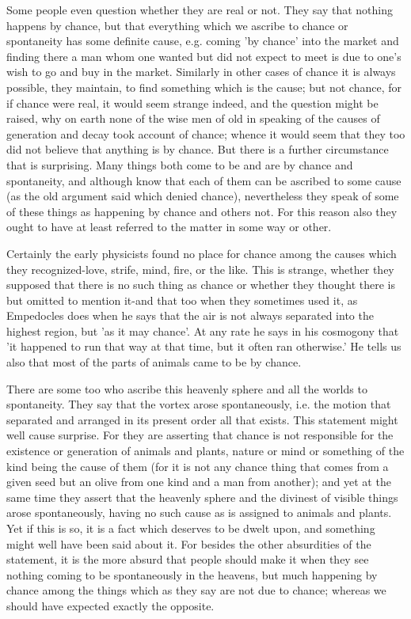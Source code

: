 Some people even question whether they are real or not. They say that
nothing happens by chance, but that everything which we ascribe to
chance or spontaneity has some definite cause, e.g. coming 'by chance'
into the market and finding there a man whom one wanted but did not
expect to meet is due to one's wish to go and buy in the market. Similarly
in other cases of chance it is always possible, they maintain, to
find something which is the cause; but not chance, for if chance were
real, it would seem strange indeed, and the question might be raised,
why on earth none of the wise men of old in speaking of the causes
of generation and decay took account of chance; whence it would seem
that they too did not believe that anything is by chance. But there
is a further circumstance that is surprising. Many things both come
to be and are by chance and spontaneity, and although know that each
of them can be ascribed to some cause (as the old argument said which
denied chance), nevertheless they speak of some of these things as
happening by chance and others not. For this reason also they ought
to have at least referred to the matter in some way or other.

Certainly the early physicists found no place for chance among the
causes which they recognized-love, strife, mind, fire, or the like.
This is strange, whether they supposed that there is no such thing
as chance or whether they thought there is but omitted to mention
it-and that too when they sometimes used it, as Empedocles does when
he says that the air is not always separated into the highest region,
but 'as it may chance'. At any rate he says in his cosmogony that
'it happened to run that way at that time, but it often ran otherwise.'
He tells us also that most of the parts of animals came to be by chance.

There are some too who ascribe this heavenly sphere and all the worlds
to spontaneity. They say that the vortex arose spontaneously, i.e.
the motion that separated and arranged in its present order all that
exists. This statement might well cause surprise. For they are asserting
that chance is not responsible for the existence or generation of
animals and plants, nature or mind or something of the kind being
the cause of them (for it is not any chance thing that comes from
a given seed but an olive from one kind and a man from another); and
yet at the same time they assert that the heavenly sphere and the
divinest of visible things arose spontaneously, having no such cause
as is assigned to animals and plants. Yet if this is so, it is a fact
which deserves to be dwelt upon, and something might well have been
said about it. For besides the other absurdities of the statement,
it is the more absurd that people should make it when they see nothing
coming to be spontaneously in the heavens, but much happening by chance
among the things which as they say are not due to chance; whereas
we should have expected exactly the opposite. 

